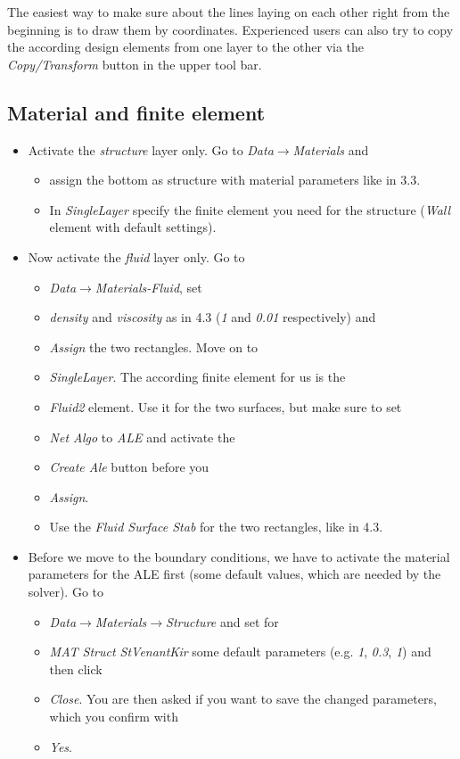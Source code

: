 The easiest way to make sure about the lines laying on each other
right from the beginning is to draw them by coordinates. Experienced
users can also try to copy the according design elements from one
layer to the other via the \emph{Copy/Transform} button in the upper
tool bar. 


\subsection{Material and finite element}

\begin{itemize}
\item Activate the \emph{structure} layer only. Go to \emph{Data$\to$Materials}
and 

\begin{itemize}
\item assign the bottom as structure with material parameters like in 3.3. 
\item In \emph{SingleLayer} specify the finite element you need for the
structure (\emph{Wall} element with default settings).
\end{itemize}
\item Now activate the \emph{fluid} layer only. Go to 

\begin{itemize}
\item \emph{Data$\to$Materials-Fluid}, set 
\item \emph{density} and \emph{viscosity} as in 4.3 (\emph{1} and \emph{0.01} respectively) and 
\item \emph{Assign} the two rectangles. Move on to 
\item \emph{SingleLayer}. The according finite element for us is the 
\item \emph{Fluid2} element. Use it for the two surfaces, but make sure
to set 
\item \emph{Net Algo} to \emph{ALE} and activate the 
\item \emph{Create Ale} button before you 
\item \emph{Assign}. 
\item Use the \emph{Fluid Surface Stab} for the two rectangles, like in
4.3.
\end{itemize}
\item Before we move to the boundary conditions, we have to activate the
material parameters for the ALE first (some default values, which
are needed by the solver). Go to

\begin{itemize}
\item \emph{Data$\to$Materials$\to$Structure} and set for 
\item \emph{MAT Struct StVenantKir} some default parameters (e.g. \emph{1},
\emph{0.3}, \emph{1}) and then click 
\item \emph{Close}. You are then asked if you want to save the changed parameters,
which you confirm with \emph{}
\item \emph{Yes}.
\end{itemize}
\end{itemize}
